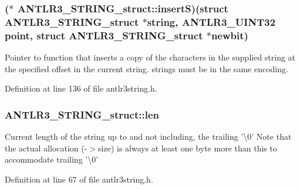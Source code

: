 \hypertarget{struct_a_n_t_l_r3___s_t_r_i_n_g__struct_a11f681cc8ecee301279fc6be4a9b22d2}{
\subsubsection[{insert\-S}]{($\ast$ A\-N\-T\-L\-R3\-\_\-\-S\-T\-R\-I\-N\-G\-\_\-struct\-::insert\-S)(struct {\bf A\-N\-T\-L\-R3\-\_\-\-S\-T\-R\-I\-N\-G\-\_\-struct} $\ast$string, {\bf A\-N\-T\-L\-R3\-\_\-\-U\-I\-N\-T32} point, struct {\bf A\-N\-T\-L\-R3\-\_\-\-S\-T\-R\-I\-N\-G\-\_\-struct} $\ast$newbit)}}\label{struct_a_n_t_l_r3___s_t_r_i_n_g__struct_a11f681cc8ecee301279fc6be4a9b22d2}
Pointer to function that inserts a copy of the characters in the supplied string at the specified offset in the current string. strings must be in the same encoding. 

Definition at line 136 of file antlr3string.\-h.

\hypertarget{struct_a_n_t_l_r3___s_t_r_i_n_g__struct_a48075cfe15e36cca07604d96d335829d}{
\subsubsection[{len}]{ A\-N\-T\-L\-R3\-\_\-\-S\-T\-R\-I\-N\-G\-\_\-struct\-::len}}\label{struct_a_n_t_l_r3___s_t_r_i_n_g__struct_a48075cfe15e36cca07604d96d335829d}
Current length of the string up to and not including, the trailing '\textbackslash{}0' Note that the actual allocation (-\/$>$size) is always at least one byte more than this to accommodate trailing '\textbackslash{}0' 

Definition at line 67 of file antlr3string.\-h.

